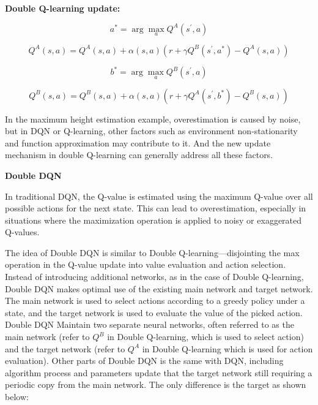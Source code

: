 \documentclass{article}
\begin{document}
\hspace*{\fill}

\begin{mdframed}[hidealllines=false,backgroundcolor=white!20]
        \textbf{Double Q-learning update:}

\hspace*{\fill}

\begin{equation}
a^*=\arg \max _a Q^A\left(s^{\prime}, a\right)
\end{equation}

\begin{equation}
Q^A(s, a)= Q^A(s, a)+\alpha(s, a)\left(r+\gamma Q^B\left(s^{\prime}, a^*\right)-Q^A(s, a)\right)
\end{equation}

\begin{equation}
b^*=\arg \max _a Q^B\left(s^{\prime}, a\right)
\end{equation}

\begin{equation}
Q^B(s, a) = Q^B(s, a)+\alpha(s, a)\left(r+\gamma Q^A\left(s^{\prime}, b^*\right)-Q^B(s, a)\right)
\end{equation}

\end{mdframed}

In the  maximum height estimation example, overestimation is caused by noise, but in DQN or Q-learning, other factors such as environment non-stationarity and function approximation may contribute to it. And the new update mechanism in double Q-learning can generally address all these factors.


\hspace*{\fill}

\noindent
\textbf{Double DQN}\\
\noindent

In traditional DQN, the Q-value is estimated using the maximum Q-value over all possible actions for the next state. This can lead to overestimation, especially in situations where the maximization operation is applied to noisy or exaggerated Q-values.


The idea of Double DQN is similar to Double Q-learning—disjointing the max operation in the Q-value update into value evaluation and action selection. Instead of introducing additional networks, as in the case of Double Q-learning, Double DQN makes optimal use of the existing main network and target network. The main network is used to select actions according to a greedy policy under a state, and the target network is used to evaluate the value of the picked action. Double DQN Maintain two separate neural networks, often referred to as the main network (refer to $Q^B$ in Double Q-learning, which is used to select action) and the target network (refer to $Q^A$ in Double Q-learning which is used for action evaluation). Other parts of Double DQN is the same with DQN, including algorithm process and parameters update that the target network still requiring a periodic copy from the main network. The only difference is the target as shown below:
\end{document}
